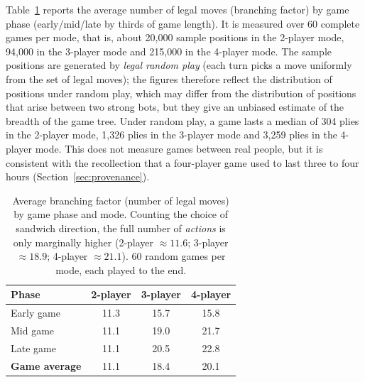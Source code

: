 Table~\ref{tab:branching} reports the average number of legal moves
(branching factor) by game phase (early/mid/late by thirds of game length).
It is measured over 60 complete games per mode, that is, about 20,000 sample
positions in the 2-player mode, 94,000 in the 3-player mode and 215,000 in
the 4-player mode. The sample
positions are generated by \emph{legal random play} (each turn picks a move
uniformly from the set of legal moves); the figures therefore reflect the
distribution of positions under random play, which may differ from the
distribution of positions that arise between two strong bots, but they give
an unbiased estimate of the breadth of the game tree. Under random play, a
game lasts a median of 304 plies in the 2-player mode, 1,326 plies in the
3-player mode and 3,259 plies in the 4-player mode. This does not measure
games between real people, but it is consistent with the recollection that
a four-player game used to last three to four hours
(Section~\ref{sec:provenance}).

\begin{table}[H]
  \centering
  \caption{Average branching factor (number of legal moves) by game phase
  and mode. Counting the choice of sandwich direction, the full number of
  \emph{actions} is only marginally higher (2-player $\approx 11.6$;
  3-player $\approx 18.9$; 4-player $\approx 21.1$). 60 random games per mode,
  each played to the end.}
  \label{tab:branching}
  \begin{tabular}{lccc}
    \toprule
    \textbf{Phase} & \textbf{2-player} & \textbf{3-player} & \textbf{4-player} \\
    \midrule
    Early game & 11.3 & 15.7 & 15.8 \\
    Mid game   & 11.1 & 19.0 & 21.7 \\
    Late game  & 11.1 & 20.5 & 22.8 \\
    \midrule
    \textbf{Game average} & 11.1 & 18.4 & 20.1 \\
    \bottomrule
  \end{tabular}
\end{table}

